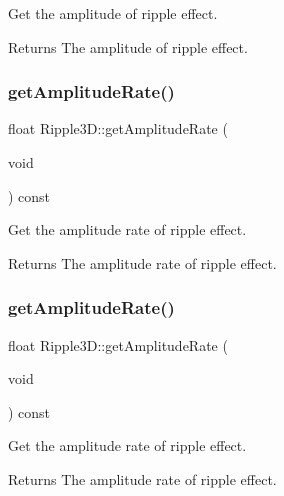 Get the amplitude of ripple effect. 

\begin{DoxyReturn}{Returns}
The amplitude of ripple effect. 
\end{DoxyReturn}
\mbox{\label{classRipple3D_a721189b2c0cca07f653f4a625ef8a2c1}} 
\subsubsection{\texorpdfstring{get\+Amplitude\+Rate()}{getAmplitudeRate()}\hspace{0.1cm}{\footnotesize\ttfamily [1/2]}}
{\footnotesize\ttfamily float Ripple3\+D\+::get\+Amplitude\+Rate (\begin{DoxyParamCaption}\item[{void}]{ }\end{DoxyParamCaption}) const\hspace{0.3cm}{\ttfamily [inline]}}



Get the amplitude rate of ripple effect. 

\begin{DoxyReturn}{Returns}
The amplitude rate of ripple effect. 
\end{DoxyReturn}
\mbox{\label{classRipple3D_a721189b2c0cca07f653f4a625ef8a2c1}} 
\subsubsection{\texorpdfstring{get\+Amplitude\+Rate()}{getAmplitudeRate()}\hspace{0.1cm}{\footnotesize\ttfamily [2/2]}}
{\footnotesize\ttfamily float Ripple3\+D\+::get\+Amplitude\+Rate (\begin{DoxyParamCaption}\item[{void}]{ }\end{DoxyParamCaption}) const\hspace{0.3cm}{\ttfamily [inline]}}



Get the amplitude rate of ripple effect. 

\begin{DoxyReturn}{Returns}
The amplitude rate of ripple effect. 
\end{DoxyReturn}
\mbox{\label{classRipple3D_aea226ed8d1d72fa88cd5643a75c5e404}} 
